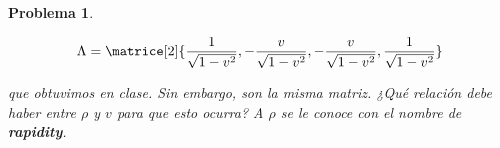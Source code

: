 \documentclass[12pt]{article}
\theoremstyle{break}
\newtheorem{exercise}{Problema}
\theoremstyle{nonumberbreak}
\begin{document}
\begin{exercise}
\begin{enumerate}[label = \alph*)]
            \begin{equation*}
                \Lambda =
                        \matrice[2]{\frac{1}{\sqrt{1 - v^{2}}},
                                    -\frac{v}{\sqrt{1 - v^{2}}},
                                    -\frac{v}{\sqrt{1 - v^{2}}},
                                    \frac{1}{\sqrt{1 - v^{2}}}}
            \end{equation*}

            que obtuvimos en clase. Sin embargo, son la misma matriz. ¿Qué relación debe haber entre \(\rho\) y \(v\) para que esto ocurra? A \(\rho\) se le conoce con el nombre de \textbf{rapidity}.
        \end{enumerate}
    \end{exercise}
\end{document}
